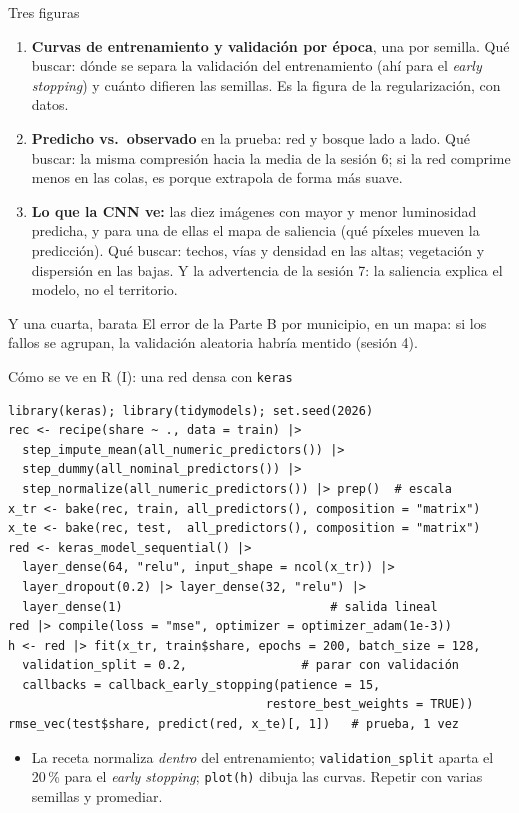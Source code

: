 \documentclass{beamer}
\newcommand{\1}{\mathbb{I}}
\begin{document}
\begin{frame}{Tres figuras}
\small
\begin{enumerate}\itemsep4pt
  \item \textbf{Curvas de entrenamiento y validación por época}, una por semilla. Qué buscar: dónde se separa la validación del entrenamiento (ahí para el \emph{early stopping}) y cuánto difieren las semillas. Es la figura de la regularización, con datos. \pause
  \item \textbf{Predicho vs.\ observado} en la prueba: red y bosque lado a lado. Qué buscar: la misma compresión hacia la media de la sesión 6; si la red comprime menos en las colas, es porque extrapola de forma más suave. \pause
  \item \textbf{Lo que la CNN ve:} las diez imágenes con mayor y menor luminosidad predicha, y para una de ellas el mapa de saliencia (qué píxeles mueven la predicción). Qué buscar: techos, vías y densidad en las altas; vegetación y dispersión en las bajas. Y la advertencia de la sesión 7: la saliencia explica el modelo, no el territorio.
\end{enumerate}
\pause
\begin{block}{Y una cuarta, barata}
El error de la Parte B por municipio, en un mapa: si los fallos se agrupan, la validación aleatoria habría mentido (sesión 4).
\end{block}
\end{frame}

\begin{frame}[fragile]{Cómo se ve en R (I): una red densa con \texttt{keras}}
\scriptsize
\begin{verbatim}
library(keras); library(tidymodels); set.seed(2026)
rec <- recipe(share ~ ., data = train) |>
  step_impute_mean(all_numeric_predictors()) |>
  step_dummy(all_nominal_predictors()) |>
  step_normalize(all_numeric_predictors()) |> prep()  # escala
x_tr <- bake(rec, train, all_predictors(), composition = "matrix")
x_te <- bake(rec, test,  all_predictors(), composition = "matrix")
red <- keras_model_sequential() |>
  layer_dense(64, "relu", input_shape = ncol(x_tr)) |>
  layer_dropout(0.2) |> layer_dense(32, "relu") |>
  layer_dense(1)                             # salida lineal
red |> compile(loss = "mse", optimizer = optimizer_adam(1e-3))
h <- red |> fit(x_tr, train$share, epochs = 200, batch_size = 128,
  validation_split = 0.2,                # parar con validación
  callbacks = callback_early_stopping(patience = 15,
                                    restore_best_weights = TRUE))
rmse_vec(test$share, predict(red, x_te)[, 1])   # prueba, 1 vez
\end{verbatim}
\normalsize
\small
\begin{itemize}\itemsep2pt
  \item La receta normaliza \emph{dentro} del entrenamiento; \texttt{validation\_split} aparta el 20\,\% para el \emph{early stopping}; \texttt{plot(h)} dibuja las curvas. Repetir con varias semillas y promediar.
\end{itemize}
\end{frame}
\end{document}
